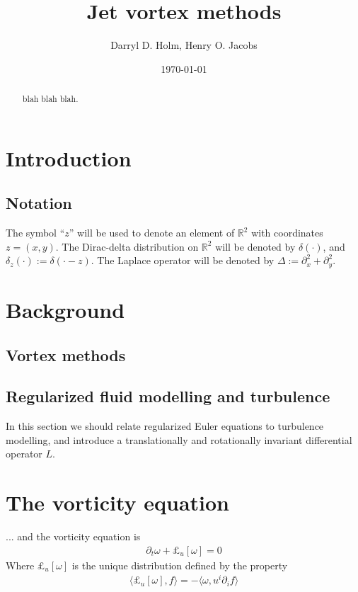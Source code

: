 \documentclass[12pt]{amsart}
\title{Jet vortex methods}
\author{Darryl D. Holm, Henry O. Jacobs}
\date{\today}
\begin{document}
\maketitle

\begin{abstract}
  blah blah blah.
\end{abstract}

\section{Introduction}
\label{sec:intro}


\subsection{Notation}
The symbol ``$z$'' will be used to denote
an element of $\mathbb{R}^2$
with coordinates $z = (x,y)$.
The Dirac-delta distribution on $\mathbb{R}^2$
will be denoted by $\delta(\cdot)$, and $\delta_z(\cdot) := \delta( \cdot - z)$.
The Laplace operator will be denoted by $\Delta := \partial_x^2 + \partial_y^2$.

\section{Background}

\subsection{Vortex methods}

\subsection{Regularized fluid modelling and turbulence}
\label{sec:turbulence}

In this section we should relate regularized Euler equations 
to turbulence modelling, and introduce a translationally and rotationally invariant differential operator $L$.

\section{The vorticity equation}
\label{sec:vorticity}


... and the vorticity equation is
\begin{align*}
  \partial_t \omega + \pounds_u [\omega] = 0
\end{align*}
Where $\pounds_u[\omega]$ is the unique distribution defined by the property
\begin{align*}
  \langle \pounds_u[\omega] , f \rangle = - \langle \omega , u^i \partial_i f \rangle
\end{align*}
\end{document}
